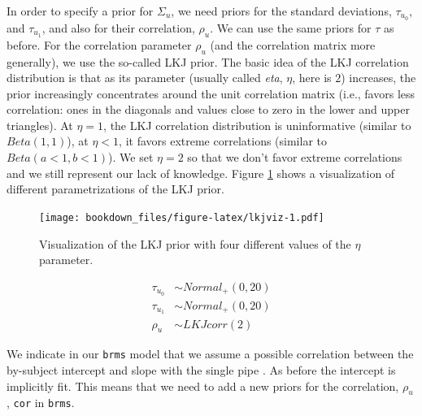 \documentclass[12pt,]{krantz}
\theoremstyle{definition}
\theoremstyle{definition}
\theoremstyle{definition}
\theoremstyle{remark}
\begin{document}
In order to specify a prior for \(\Sigma_u\), we need priors for the standard deviations, \(\tau_{u_0}\), and \(\tau_{u_1}\), and also for their correlation, \(\rho_u\). We can use the same priors for \(\tau\) as before. For the correlation parameter \(\rho_u\) (and the correlation matrix more generally), we use the so-called LKJ prior. The basic idea of the LKJ correlation distribution is that as its parameter (usually called \emph{eta}, \(\eta\), here is \(2\)) increases, the prior increasingly concentrates around the unit correlation matrix (i.e., favors less correlation: ones in the diagonals and values close to zero in the lower and upper triangles). At \(\eta = 1\), the LKJ correlation distribution is uninformative (similar to \(Beta(1,1)\)), at \(\eta < 1\), it favors extreme correlations (similar to \(Beta(a<1,b<1)\)). We set \(\eta = 2\) so that we don't favor extreme correlations and we still represent our lack of knowledge. Figure \ref{fig:lkjviz} shows a visualization of different parametrizations of the LKJ prior.



\begin{figure}
\centering
\texttt{[image: bookdown\_files/figure-latex/lkjviz-1.pdf]}
\caption{\label{fig:lkjviz}Visualization of the LKJ prior with four different values of the \(\eta\) parameter.}
\end{figure}

\begin{equation}
\begin{aligned}
\tau_{u_0} &\sim Normal_+(0,20)\\
\tau_{u_1} &\sim Normal_+(0,20)\\
\rho_u &\sim LKJcorr(2) 
\end{aligned}
\end{equation}

We indicate in our \texttt{brms} model that we assume a possible correlation between the by-subject intercept and slope with the single pipe \texttt{\textbar{}}. As before the intercept is implicitly fit. This means that we need to add a new priors for the correlation, \(\rho_{u}\), \texttt{cor} in \texttt{brms}.
\end{document}
